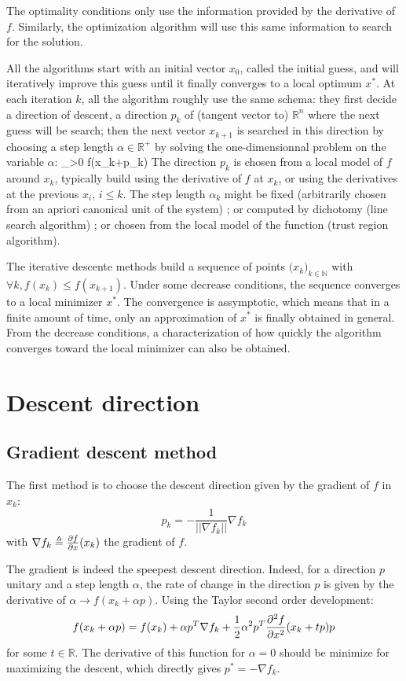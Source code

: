 \documentclass{book}
\begin{document}
The optimality conditions only use the information provided by the derivative of $f$. Similarly, the optimization algorithm will use this same information to search for the solution. 

All the algorithms start with an initial vector $x_0$, called the initial guess, and will iteratively improve this guess until it finally converges to a local optimum $x^*$. At each iteration $k$, all the algorithm roughly use the same schema: they first decide a direction of descent, \mie a direction $p_k$ of (tangent vector to) $\mathbb{R}^n$ where the next guess will be search; then the next vector $x_{k+1}$ is searched in this direction by choosing a step length $\alpha \in \mathbb{R}^+$ by solving the one-dimensionnal problem on the variable $\alpha$:
 \min_{\alpha>0} f(x_k+\alpha p_k) \EOUT
The direction $p_k$ is chosen from a local model of $f$ around $x_k$, typically build using the derivative of $f$ at $x_k$, or using the derivatives at the previous $x_i$, $i\le k$. The step length $\alpha_k$ might be fixed (arbitrarily chosen from an apriori canonical unit of the system) ; or computed by dichotomy (line search algorithm) ; or chosen from the local model of the function (trust region algorithm).

The  iterative descente methods build a sequence of points $\Big(x_k \Big)_{k\in\mathbb{N}}$ with $\forall k, f(x_k) \le f(x_{k+1})$. Under some decrease conditions, the sequence converges to a local minimizer $x^*$. The convergence is assymptotic, which means that in a finite amount of time, only an approximation of $x^*$ is finally obtained in general. From the decrease conditions, a characterization of how quickly the algorithm converges toward the local minimizer can also be obtained.

\section{Descent direction}

\subsection{Gradient descent method}

The first method is to choose the descent direction given by the gradient of $f$ in $x_k$:
\[ p_k = -\frac{1}{|| \nabla f_k||} \nabla f_k \] 
with $\nabla f_k \triangleq \frac{\partial{f}}{\partial{x}}(x_k)$ the gradient of $f$.

The gradient is indeed the speepest descent direction. Indeed, for a direction $p$ unitary and a step length $\alpha$, the rate of change in the direction $p$ is given  by the derivative of $\alpha \rightarrow f(x_k+\alpha p)$. Using the Taylor second order development:
\[ f(x_k +\alpha p) = f(x_k) + \alpha p^T \nabla f_k + \frac{1}{2} \alpha^2 p^T \frac{\partial^2{f}}{\partial{x}^2}(x_k+tp) p \]
for some $t\in\mathbb{R}$. The derivative of this function for $\alpha=0$ should be minimize for maximizing the descent, which directly gives $p^* = - \nabla f_k$.
\end{document}
